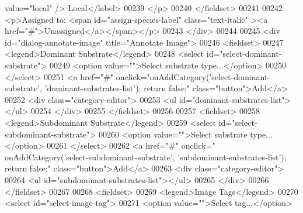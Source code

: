 \begin{DoxyCode}
      value=\textcolor{stringliteral}{"local"} /> Local</label>
00239                 </p>
00240             </fieldset>
00241 
00242             <p>Assigned to: <span \textcolor{keywordtype}{id}=\textcolor{stringliteral}{"assign-species-label"} \textcolor{keyword}{class}=\textcolor{stringliteral}{"text-italic"}
      ><a href=\textcolor{stringliteral}{"#"}>Unassigned</a></span></p>
00243         </div>
00244 
00245         <div \textcolor{keywordtype}{id}=\textcolor{stringliteral}{"dialog-annotate-image"} title=\textcolor{stringliteral}{"Annotate Image"}>
00246             <fieldset>
00247                 <legend>Dominant Substrate</legend>
00248                 <select \textcolor{keywordtype}{id}=\textcolor{stringliteral}{"select-dominant-substrate"}>
00249                     <option value=\textcolor{stringliteral}{""}>Select substrate type...</option>
00250                 </select>
00251                 <a href=\textcolor{stringliteral}{"#"} onclick=\textcolor{stringliteral}{"onAddCategory('select-dominant-substrate',
       'dominant-substrates-list'); return false;"} \textcolor{keyword}{class}=\textcolor{stringliteral}{"button"}>Add</a>
00252                 <div \textcolor{keyword}{class}=\textcolor{stringliteral}{"category-editor"}>
00253                     <ul \textcolor{keywordtype}{id}=\textcolor{stringliteral}{"dominant-substrates-list"}></ul>
00254                 </div>
00255             </fieldset>
00256 
00257             <fieldset>
00258                 <legend>Subdominant Substrate</legend>
00259                 <select \textcolor{keywordtype}{id}=\textcolor{stringliteral}{"select-subdominant-substrate"}>
00260                     <option value=\textcolor{stringliteral}{""}>Select substrate type...</option>
00261                 </select>
00262                 <a href=\textcolor{stringliteral}{"#"} onclick=\textcolor{stringliteral}{"
      onAddCategory('select-subdominant-substrate', 'subdominant-substrates-list'); return false;"} \textcolor{keyword}{class}=\textcolor{stringliteral}{"button"}>Add</a>
00263                 <div \textcolor{keyword}{class}=\textcolor{stringliteral}{"category-editor"}>
00264                     <ul \textcolor{keywordtype}{id}=\textcolor{stringliteral}{"subdominant-substrates-list"}></ul>
00265                 </div>
00266             </fieldset>
00267 
00268             <fieldset>
00269                 <legend>Image Tags</legend>
00270                 <select \textcolor{keywordtype}{id}=\textcolor{stringliteral}{"select-image-tag"}>
00271                     <option value=\textcolor{stringliteral}{""}>Select tag...</option>

\end{DoxyCode}
